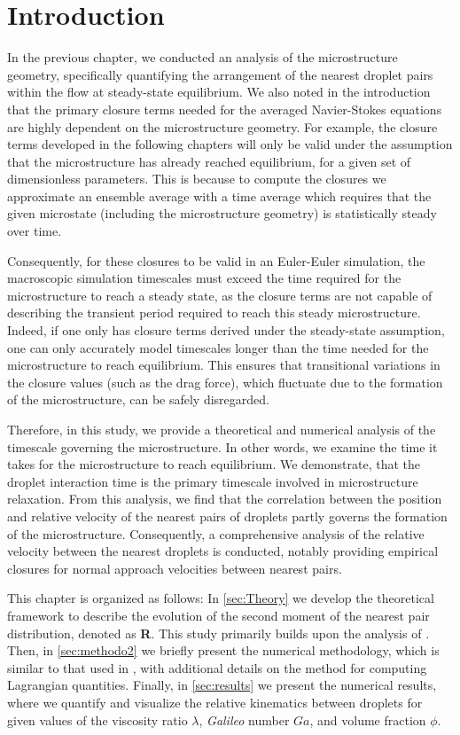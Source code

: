 \section{Introduction}

In the previous chapter, we conducted an analysis of the microstructure geometry, specifically quantifying the arrangement of the nearest droplet pairs within the flow at steady-state equilibrium. 
We also noted in the introduction that the primary closure terms needed for the averaged Navier-Stokes equations are highly dependent on the microstructure geometry. 
For example, the closure terms developed in the following chapters will only be valid under the assumption that the microstructure has already reached equilibrium, for a given set of dimensionless parameters.
This is because to compute the closures we approximate an ensemble average with a time average which requires that the given microstate (including the microstructure geometry) is statistically steady over time. 

Consequently, for these closures to be valid in an Euler-Euler simulation, the macroscopic simulation timescales must exceed the time required for the microstructure to reach a steady state, as the closure terms are not capable of describing the transient period required to reach this steady microstructure. 
Indeed, if one only has closure terms derived under the steady-state assumption, one can only accurately model timescales longer than the time needed for the microstructure to reach equilibrium. 
This ensures that transitional variations in the closure values (such as the drag force), which fluctuate due to the formation of the microstructure, can be safely disregarded.


Therefore, in this study, we provide a theoretical and numerical analysis of the timescale governing the microstructure. 
In other words, we examine the time it takes for the microstructure to reach equilibrium. 
We demonstrate, that the droplet interaction time is the primary timescale involved in microstructure relaxation. 
From this analysis, we find that the correlation between the position and relative velocity of the nearest pairs of droplets partly governs the formation of the microstructure. 
Consequently, a comprehensive analysis of the relative velocity between the nearest droplets is conducted, notably providing empirical closures for normal approach velocities between nearest pairs. 

This chapter is organized as follows: 
In \ref{sec:Theory} we develop the theoretical framework to describe the evolution of the second moment of the nearest pair distribution, denoted as \textbf{R}.
This study primarily builds upon the analysis of \citet{zhang2023evolution}. 
Then, in \ref{sec:methodo2} we briefly present the numerical methodology, which is similar to that used in \citet{fintzi2024buoyancy}, with additional details on the method for computing Lagrangian quantities. 
Finally, in \ref{sec:results} we present the numerical results, where we quantify and visualize the relative kinematics   between droplets for given values of the viscosity ratio $\lambda$, \textit{Galileo} number $Ga$, and volume fraction $\phi$.

